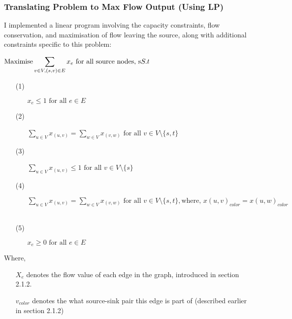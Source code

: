 \documentclass{homeworg}
\begin{document}
\subsubsection{Translating Problem to Max Flow Output (Using LP)}
I implemented a linear program involving the capacity constraints, flow conservation, and maximisation of flow leaving the source, along with additional constraints specific to this problem:\par
\(\text{Maximise} \displaystyle\sum_{v \in V, (s,v) \in E}x_e \text{ for all source nodes, s}\\
S.t\\\)
\begin{enumerate}
    \item[(1)] 
        \begin{enumerate}
        	\item[] \(x_e \leq 1 \text{ for all }e \in E\)
        \end{enumerate}
    \item[(2)]
        \begin{enumerate}
        	\item[] \(\displaystyle\sum_{u \in V}x_(u,v) = \displaystyle\sum_{w \in V}x_(v,w) \text{ for all } v \in V \text{\textbackslash} \{s, t\} \)\
        \end{enumerate}
    \item[(3)] 
        \begin{enumerate}
        	\item[] \(\displaystyle\sum_{u \in V}x_(u,v) \leq 1 \text{ for all } v \in V \text{\textbackslash} \{s\} \)\
        \end{enumerate}
    \item[(4)] 
        \begin{enumerate}
        	\item[] \(\displaystyle\sum_{u \in V}x_(u,v) = \displaystyle\sum_{w \in V}x_(v,w) \text{ for all } v \in V \text{\textbackslash} \{s, t\}, \text{where, } x(u,v)_{color} = x(u,w)_{color} \)\
        \end{enumerate}
    \item[(5)] 
        \begin{enumerate}
        	\item[] \(x_e \geq 0 \text{ for all } e \in E\)
    \end{enumerate}
\end{enumerate}

Where,
\begin{enumerate}
    \item[] \(X_e\) denotes the flow value of each edge in the graph, introduced in section 2.1.2.
    \item[] \(v_{color}\) denotes the what source-sink pair this edge is part of (described earlier in section 2.1.2)
\end{enumerate}
\end{document}
